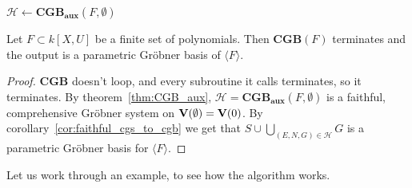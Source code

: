 \begin{algorithm}
  \caption{$\mathbf{CGB}$}
  $\mathcal H \gets \mathbf{CGB_{aux}}(F, \emptyset)$\;
  \;
\end{algorithm}
\begin{theorem}
  Let $F \subset k[X, U]$ be a finite set of polynomials. Then $\mathbf{CGB}(F)$ terminates and the output is a parametric Gröbner basis of $\langle F \rangle$.
\end{theorem}
\begin{proof}
  $\mathbf{CGB}$ doesn't loop, and every subroutine it calls terminates, so it terminates. By theorem~\ref{thm:CGB_aux}, $\mathcal H = \mathbf{CGB_{aux}}(F, \emptyset)$ is a faithful, comprehensive Gröbner system on $\operatorname{\mathbf V}(\emptyset) = \operatorname{\mathbf V}(0)$. By corollary~\ref{cor:faithful_cgs_to_cgb} we get that $S \cup \bigcup_{(E, N, G) \in \mathcal H} G$ is a parametric Gröbner basis for $\langle F \rangle$.
\end{proof}

Let us work through an example, to see how the algorithm works.

